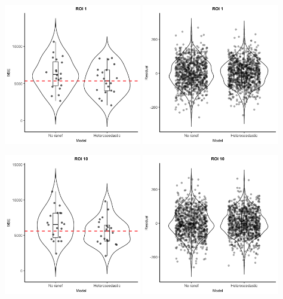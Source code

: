  \includegraphics[width=0.45\textwidth]{ROI1_voilin_nohomo.png}
 \includegraphics[width=0.45\textwidth]{ROI1_voilin_resi_nohomo.png}
 
\includegraphics[width=0.45\textwidth]{ROI10_voilin_nohomo.png}
\includegraphics[width=0.45\textwidth]{ROI10_voilin_resi_nohomo.png}

